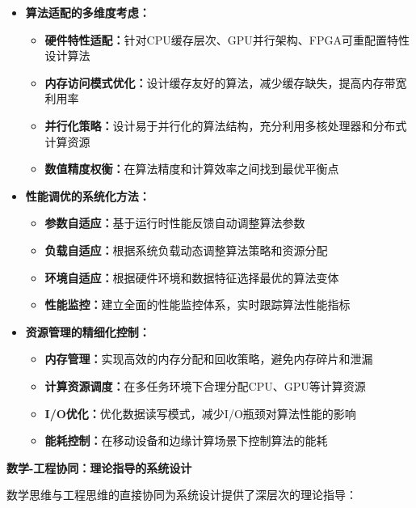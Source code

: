 \begin{itemize}
\item \textbf{算法适配的多维度考虑：}
\begin{itemize}
\item \textbf{硬件特性适配：}针对CPU缓存层次、GPU并行架构、FPGA可重配置特性设计算法
\item \textbf{内存访问模式优化：}设计缓存友好的算法，减少缓存缺失，提高内存带宽利用率
\item \textbf{并行化策略：}设计易于并行化的算法结构，充分利用多核处理器和分布式计算资源
\item \textbf{数值精度权衡：}在算法精度和计算效率之间找到最优平衡点
\end{itemize}

\item \textbf{性能调优的系统化方法：}
\begin{itemize}
\item \textbf{参数自适应：}基于运行时性能反馈自动调整算法参数
\item \textbf{负载自适应：}根据系统负载动态调整算法策略和资源分配
\item \textbf{环境自适应：}根据硬件环境和数据特征选择最优的算法变体
\item \textbf{性能监控：}建立全面的性能监控体系，实时跟踪算法性能指标
\end{itemize}

\item \textbf{资源管理的精细化控制：}
\begin{itemize}
\item \textbf{内存管理：}实现高效的内存分配和回收策略，避免内存碎片和泄漏
\item \textbf{计算资源调度：}在多任务环境下合理分配CPU、GPU等计算资源
\item \textbf{I/O优化：}优化数据读写模式，减少I/O瓶颈对算法性能的影响
\item \textbf{能耗控制：}在移动设备和边缘计算场景下控制算法的能耗
\end{itemize}
\end{itemize}

\textbf{数学-工程协同：理论指导的系统设计}

数学思维与工程思维的直接协同为系统设计提供了深层次的理论指导：

